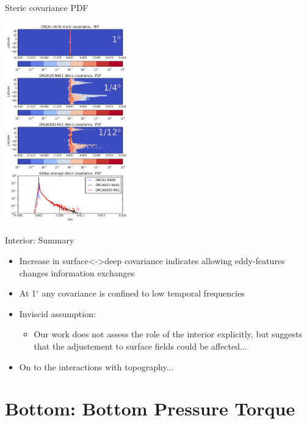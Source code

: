 \documentclass{beamer}
\begin{document}
\begin{frame}{Steric covariance PDF}
\vspace{-10}
\begin{center}
\centering \includegraphics[width=0.4\textwidth]{PDF_SH_covCutP.png}
\end{center} 
\end{frame}

\begin{frame}{Interior: Summary}
\begin{itemize}
 \item Increase in surface<->deep covariance indicates allowing eddy-features changes information exchanges
 \item At 1$^{\circ}$ any covariance is confined to low temporal frequencies
 \item Inviscid assumption:
 \begin{itemize}
  \item Our work does not assess the role of the interior explicitly, but suggests that the adjustement to surface fields could be affected...
 \end{itemize}
\pause
 \item On to the interactions with topography...
\end{itemize}



\end{frame}

\section{Bottom: Bottom Pressure Torque}
\end{document}
